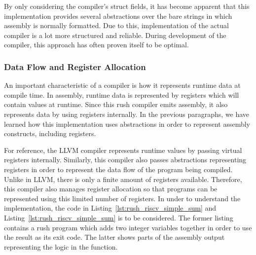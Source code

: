 By only considering the compiler's struct fields, it has become apparent that this implementation provides several abstractions over the bare strings in which assembly is normally formatted.
Due to this, implementation of the actual compiler is a lot more structured and reliable.
During development of the compiler, this approach has often proven itself to be optimal.

\subsubsection{Data Flow and Register Allocation}

An important characteristic of a compiler is how it represents runtime data at compile time.
In assembly, runtime data is represented by registers which will contain values at runtime.
Since this rush compiler emits \riscv{} assembly, it also represents data by using registers internally.
In the previous paragraphs, we have learned how this implementation uses abstractions in order to represent assembly constructs, including registers.

For reference, the LLVM compiler represents runtime values by passing virtual registers internally.
Similarly, this compiler also passes abstractions representing registers in order to represent the data flow of the program being compiled.
Unlike in LLVM, there is only a finite amount of registers available.
Therefore, this compiler also manages register allocation so that programs can be represented using this limited number of registers.
In under to understand the implementation, the code in Listing~\ref{lst:rush_riscv_simple_sum} and Listing~\ref{lst:rush_riscv_simple_sum} is to be considered.
The former listing contains a rush program which adds two integer variables together in order to use the result as its exit code.
The latter shows parts of the assembly output representing the logic in the  function.

\begin{minipage}{.34\textwidth}
	\center
\end{minipage}%
\hspace{3cm}
\begin{minipage}{.45\textwidth}
	\center
\end{minipage}

